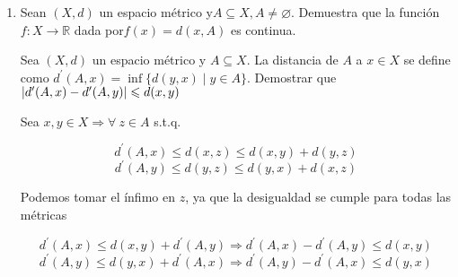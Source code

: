 \documentclass[12pt]{article}
\newcommand\R{\ensuremath{\mathbb{R}}}
\begin{document}
\begin{enumerate}[label=\textbf{\arabic*}.]
\begin{proof}
    Sea $\delta = min (\{ \delta(1),...,\delta(n)\})$

    \begin{equation*}
        \text{Si} \: x \in X \: \text{y} \: d(x,y) \leqslant \delta \leqslant \delta(1) \leqslant ... \leqslant \delta(n)
    \end{equation*}
    \begin{equation*}
         \Rightarrow \norm{f(x)-f(y)} \leqslant \abs{{f}_{1}(x) - f_1(y)} + ... + \abs{{f}_{n}(x) - {f}_{n}(y)} < \frac{\varepsilon}{n} + ... + \frac{\varepsilon}{n} = n \cdot \frac{\varepsilon}{n} = \varepsilon
    \end{equation*}

    $\therefore f$ es continua en $X$.
\end{proof}

\item Sean $(X, d)$ un espacio métrico y$ A \subseteq X, A \neq \varnothing$. Demuestra que la función $f : X \to \R$ dada por$ f(x) = d(x, A)$ es continua.

\begin{lema}

    Sea $(X, d)$ un espacio métrico y $A \subseteq X$. La distancia de $A$ a $x \in X $ se define como ${d}^{\prime}(A,x) = \inf \{ d(y,x) \mid y \in A \}$. Demostrar que $\abs{{d}^{\prime}(A,x)-{d}^{\prime}(A,y)} \leqslant d(x,y)$
    
    Sea $x,y \in X \Rightarrow \forall \: z \in A$ s.t.q.

    \begin{equation*}
        {d}^{\prime}(A,x) \leqslant d(x,z) \leqslant d(x,y) + d(y,z)
    \end{equation*}
    \begin{equation*}
        {d}^{\prime}(A,y) \leqslant d(y,z) \leqslant d(y,x) + d(x,z)
    \end{equation*}

    Podemos tomar el ínfimo en $z$, ya que la desigualdad se cumple para todas las métricas

    \begin{equation*}
        {d}^{\prime}(A,x) \leqslant d(x,y) + {d}^{\prime}(A,y) \Rightarrow  {d}^{\prime}(A,x) - {d}^{\prime}(A,y)  \leqslant d(x,y) 
    \end{equation*}
    \begin{equation*}
        {d}^{\prime}(A,y)  \leqslant d(y,x) + {d}^{\prime}(A,x) \Rightarrow {d}^{\prime}(A,y) - {d}^{\prime}(A,x) \leqslant d(y,x)
    \end{equation*}


\end{lema}
\end{enumerate}
\end{document}

